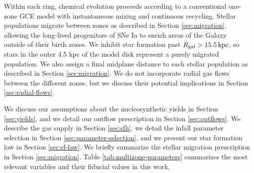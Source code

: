 \documentclass[twocolumn,twocolappendix,linenumbers]{aastex631}
\begin{document}
Within each ring, chemical evolution proceeds according to a conventional one-zone GCE model with instantaneous mixing and continuous recycling. Stellar populations migrate between zones as described in Section \ref{sec:migration}, allowing the long-lived progenitors of SNe Ia to enrich areas of the Galaxy outside of their birth zones. We inhibit star formation past $R_{\rm gal}>15.5\,{\rm kpc}$, so stars in the outer 4.5 kpc of the model disk represent a purely migrated population. We also assign a final midplane distance to each stellar population as described in Section \ref{sec:migration}. We do not incorporate radial gas flows between the different zones, but we discuss their potential implications in Section \ref{sec:radial-flows}.

We discuss our assumptions about the nucleosynthetic yields in Section \ref{sec:yields}, and we detail our outflow prescription in Section \ref{sec:outflows}. We describe the gas supply in Section \ref{sec:sfh}, we detail the infall parameter selection in Section \ref{sec:parameter-selection}, and we present our star formation law in Section \ref{sec:sf-law}. We briefly summarize the stellar migration prescription in Section \ref{sec:migration}. Table \ref{tab:multizone-parameters} summarizes the most relevant variables and their fiducial values in this work.
\end{document}
